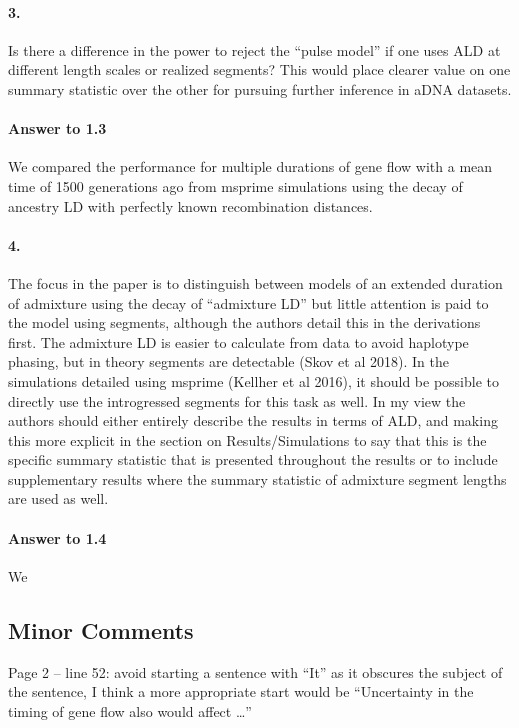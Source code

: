 \documentclass[11pt]{article}
\let\oldparagraph\paragraph
\renewcommand{\paragraph}[1]{\oldparagraph{#1}\mbox{}}
\begin{document}
\paragraph{3.}
Is there a difference in the power to reject the “pulse model” if one uses ALD at different length scales or realized segments? This would place clearer value on one summary statistic over the other for pursuing further inference in aDNA datasets. 

\paragraph{Answer to 1.3}
We compared the performance for multiple durations of gene flow with a mean time of 1500 generations ago from msprime simulations using the decay of ancestry LD with perfectly known recombination distances.


\paragraph{4.}
The focus in the paper is to distinguish between models of an extended duration of admixture using the decay of “admixture LD” but little attention is paid to the model using segments, although the authors detail this in the derivations first. The admixture LD is easier to calculate from data to avoid haplotype phasing, but in theory segments are detectable (Skov et al 2018). In the simulations detailed using msprime (Kellher et al 2016), it should be possible to directly use the introgressed segments for this task as well. In my view the authors should either entirely describe the results in terms of ALD, and making this more explicit in the section on Results/Simulations to say that this is the specific summary statistic that is presented throughout the results or to include supplementary results where the summary statistic of admixture segment lengths are used as well. 

\paragraph{Answer to 1.4}
We 

\subsection{Minor Comments}\label{Minor Comments}

Page 2 – line 52: avoid starting a sentence with “It” as it obscures the subject of the sentence, I think a more appropriate start would be “Uncertainty in the timing of gene flow also would affect …”
\end{document}

